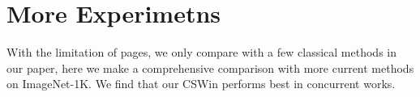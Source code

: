 \documentclass[10pt,twocolumn,letterpaper]{article}
\newcommand{\tablestyle}[2]{\setlength{\tabcolsep}{#1}\renewcommand{\arraystretch}{#2}\centering\scriptsize}
\begin{document}
\section*{More Experimetns}
With the limitation of pages, we only compare with a few classical methods in our paper, here we make a comprehensive comparison with more current methods on ImageNet-1K. We find that our CSWin performs best in concurrent works.

\begin{table*}[t]
\scriptsize
\centering
\tablestyle{6pt}{1.05}
\begin{subtable}[t]{0.33\linewidth}
\end{subtable}
\end{table*}
\end{document}
